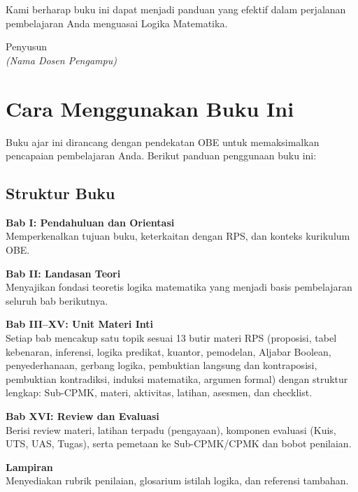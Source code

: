 Kami berharap buku ini dapat menjadi panduan yang efektif dalam perjalanan pembelajaran Anda menguasai Logika Matematika.

\vspace{1cm}
\begin{flushright}
Penyusun\\
\textit{(Nama Dosen Pengampu)}
\end{flushright}

\cleardoublepage

\chapter*{Cara Menggunakan Buku Ini}

Buku ajar ini dirancang dengan pendekatan OBE untuk memaksimalkan pencapaian pembelajaran Anda. Berikut panduan penggunaan buku ini:

\section*{Struktur Buku}

\textbf{Bab I: Pendahuluan dan Orientasi}\\
Memperkenalkan tujuan buku, keterkaitan dengan RPS, dan konteks kurikulum OBE.

\textbf{Bab II: Landasan Teori}\\
Menyajikan fondasi teoretis logika matematika yang menjadi basis pembelajaran seluruh bab berikutnya.

\textbf{Bab III--XV: Unit Materi Inti}\\
Setiap bab mencakup satu topik sesuai 13 butir materi RPS (proposisi, tabel kebenaran, inferensi, logika predikat, kuantor, pemodelan, Aljabar Boolean, penyederhanaan, gerbang logika, pembuktian langsung dan kontraposisi, pembuktian kontradiksi, induksi matematika, argumen formal) dengan struktur lengkap: Sub-CPMK, materi, aktivitas, latihan, asesmen, dan checklist.

\textbf{Bab XVI: Review dan Evaluasi}\\
Berisi review materi, latihan terpadu (pengayaan), komponen evaluasi (Kuis, UTS, UAS, Tugas), serta pemetaan ke Sub-CPMK/CPMK dan bobot penilaian.

\textbf{Lampiran}\\
Menyediakan rubrik penilaian, glosarium istilah logika, dan referensi tambahan.

